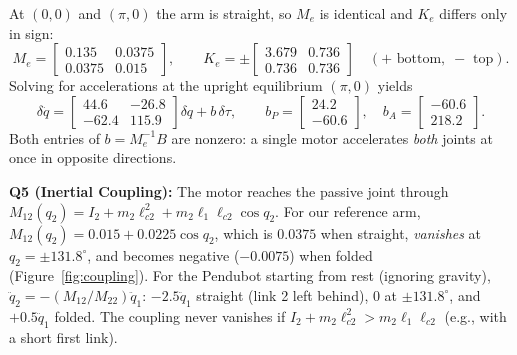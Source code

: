 \documentclass[11pt, a4paper]{article}
\theoremstyle{definition}
\theoremstyle{plain}
\begin{document}
At $(0,0)$ and $(\pi,0)$ the arm is straight, so $M_e$ is identical and $K_e$ differs only in sign:
\[
  M_e = \begin{bmatrix} 0.135 & 0.0375 \\ 0.0375 & 0.015 \end{bmatrix}, \qquad
  K_e = \pm \begin{bmatrix} 3.679 & 0.736 \\ 0.736 & 0.736 \end{bmatrix} \quad (+ \text{ bottom},\; - \text{ top}).
\]
Solving for accelerations at the upright equilibrium $(\pi, 0)$ yields
\[
  \delta\ddot{q} = \begin{bmatrix} 44.6 & -26.8 \\ -62.4 & 115.9 \end{bmatrix} \delta q + b\,\delta\tau,
  \qquad b_P = \begin{bmatrix} 24.2 \\ -60.6 \end{bmatrix}, \quad b_A = \begin{bmatrix} -60.6 \\ 218.2 \end{bmatrix}.
\]
Both entries of $b = M_e^{-1} B$ are nonzero: a single motor accelerates \emph{both} joints at once in opposite directions.

\textbf{Q5 (Inertial Coupling):} The motor reaches the passive joint through $M_{12}(q_2) = I_2 + m_2 \ell_{c2}^2 + m_2 \ell_1 \ell_{c2}\cos q_2$. For our reference arm, $M_{12}(q_2) = 0.015 + 0.0225\cos q_2$, which is $0.0375$ when straight, \emph{vanishes} at $q_2 = \pm 131.8^\circ$, and becomes negative ($-0.0075$) when folded (Figure~\ref{fig:coupling}). For the Pendubot starting from rest (ignoring gravity), $\ddot{q}_2 = -(M_{12}/M_{22})\ddot{q}_1$: $-2.5\ddot{q}_1$ straight (link 2 left behind), $0$ at $\pm 131.8^\circ$, and $+0.5\ddot{q}_1$ folded. The coupling never vanishes if $I_2 + m_2 \ell_{c2}^2 > m_2 \ell_1 \ell_{c2}$ (e.g., with a short first link).
\end{document}
